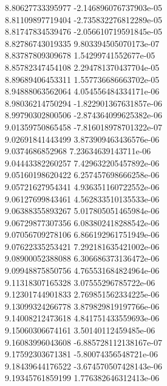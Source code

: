 {8.80627733395977 -2.146896076737903e-05 \\
8.81109897719404 -2.735832276812289e-05 \\
8.81747834539476 -2.056610719591845e-05 \\
8.82786743019335 9.803394505070173e-07 \\
8.83787809309678 1.54299741552677e-05 \\
8.85782347454108 2.294781370437704e-05 \\
8.89689406453311 1.557736686663702e-05 \\
8.94888063562064 4.054556484334171e-06 \\
8.98036214750294 -1.822901367631857e-06 \\
8.99790302800506 -2.874364099625382e-06 \\
9.01359750865458 -7.816018978701322e-07 \\
9.02691841443499 3.873909463436576e-06 \\
9.0374686852968 7.23634639143711e-06 \\
9.04443382260257 7.429632205457892e-06 \\
9.05160198620422 6.257457698666258e-06 \\
9.05721627954341 4.936351160722552e-06 \\
9.06127699843461 4.562833510135533e-06 \\
9.06388355893267 5.017805051465984e-06 \\
9.06729877307356 6.083802418288542e-06 \\
9.07056709278106 6.866192961751949e-06 \\
9.07622335253421 7.292181635421002e-06 \\
9.08900052388088 6.306686373136472e-06 \\
9.09948875850756 4.765531684824964e-06 \\
9.11318307165328 3.07555296785722e-06 \\
9.12301744901833 2.769851562334225e-06 \\
9.13099324266778 3.879829819197766e-06 \\
9.14008212473618 4.841751433559693e-06 \\
9.15060306674161 3.50140112459485e-06 \\
9.16083996043608 -6.885728112138167e-07 \\
9.17592303671381 -5.80074356548721e-06 \\
9.18439644176522 -3.674570507428143e-06 \\
9.19345761859199 1.776382646312413e-06 \\
}
